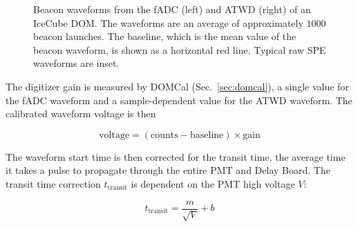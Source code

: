 \begin{figure}[!h]
  \captionsetup[subfigure]{labelformat=empty}
  \centering
  \caption{Beacon waveforms from the fADC (left) and ATWD (right) of
    an IceCube DOM. The waveforms are an average of approximately $1000$ beacon
   launches. The baseline, which is the mean value of the
    beacon waveform, is shown as a horizontal red line. Typical raw SPE
    waveforms are inset.}
  \label{fig:raw_baselines}
\end{figure}

The digitizer gain is measured by DOMCal (Sec.~\ref{sec:domcal}), a single
value for the fADC waveform and a sample-dependent value for the ATWD
waveform. The calibrated waveform voltage is then

\begin{equation}
  \mathrm{voltage} = \mathrm{(counts - baseline) \times gain}
\end{equation}

The waveform start time is then corrected for the transit time,
the average time it takes a pulse to propagate through the entire
PMT and Delay Board. The transit time correction $t_{\mathrm{transit}}$ is
dependent on the PMT high voltage $V$:

\begin{equation}
  t_{\mathrm{transit}} = \frac{m}{\sqrt{V}} + b
\end{equation}

